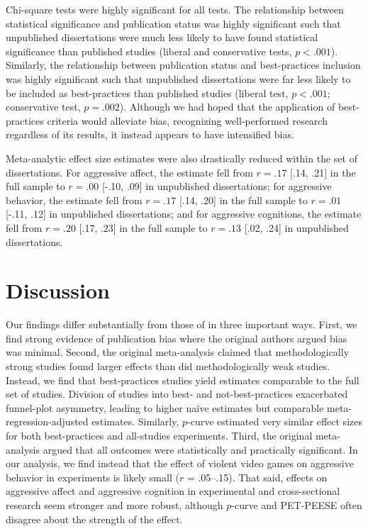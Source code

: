 \documentclass[man]{apa6}
\begin{document}
Chi-square tests were highly significant for all tests. The relationship between statistical significance and publication status was highly significant such that unpublished dissertations were much less likely to have found statistical significance than published studies (liberal and conservative tests, $p < .001$).
Similarly, the relationship between publication status and best-practices inclusion was highly significant such that unpublished dissertations were far less likely to be included as best-practices than published studies (liberal test, $p < .001$; conservative test, $p = .002$). Although we had hoped that the application of best-practices criteria would alleviate bias, recognizing well-performed research regardless of its results, it instead appears to have intensified bias.

Meta-analytic effect size estimates were also drastically reduced within the set of dissertations. For aggressive affect, the estimate fell from $r = .17$ [.14, .21] in the full sample to $r = .00$ [-.10, .09] in unpublished dissertations; for aggressive behavior, the estimate fell from $r = .17$ [.14, .20] in the full sample to $r = .01$ [-.11, .12] in unpublished dissertations; and for aggressive cognitions, the estimate fell from $r = .20$ [.17, .23] in the full sample to $r =  .13$ [.02, .24] in unpublished dissertations.  

\section{Discussion}
Our findings differ substantially from those of \citet{Anderson:etal:2010} in three important ways. First, we find strong evidence of publication bias where the original authors argued bias was minimal. Second, the original meta-analysis claimed that methodologically strong studies found larger effects than did methodologically weak studies. Instead, we find that best-practices studies yield estimates comparable to the full set of studies. Division of studies into best- and not-best-practices exacerbated funnel-plot asymmetry, leading to higher na{\"i}ve estimates but comparable meta-regression-adjusted estimates. Similarly, $p$-curve estimated very similar effect sizes for both best-practices and all-studies experiments. 
Third, the original meta-analysis argued that all outcomes were statistically and practically significant. In our analysis, we find instead that the effect of violent video games on aggressive behavior in experiments is likely small ($r$ = .05--.15). That said, effects on aggressive affect and aggressive cognition in experimental and cross-sectional research seem stronger and more robust, although $p$-curve and PET-PEESE often disagree about the strength of the effect.
\end{document}
